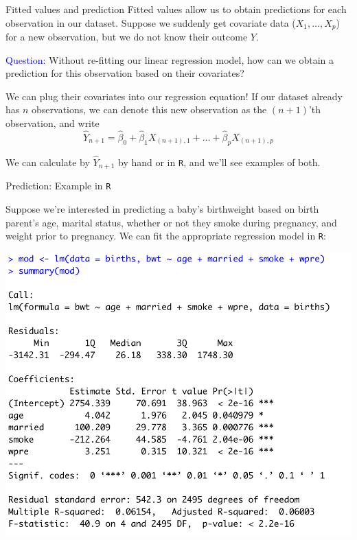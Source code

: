 \documentclass[10pt,t]{beamer}
\begin{document}
\begin{frame}{Fitted values and prediction}
Fitted values allow us to obtain predictions for each observation in our dataset. Suppose we suddenly get covariate data ($X_1, \dots, X_p$) for a new observation, but we do not know their outcome $Y$. 

\vspace{0.3cm} 

\textcolor{blue}{Question:} Without re-fitting our linear regression model, how can we obtain a prediction for this observation based on their covariates? \pause

\vspace{0.3cm}

We can plug their covariates into our regression equation! If our dataset already has $n$ observations, we can denote this new observation as the $(n + 1)$'th observation, and write
$$
\hat{Y}_{n + 1} = \hat{\beta}_0 + \hat{\beta}_1 X_{(n + 1), 1} + \dots + \hat{\beta}_p X_{(n + 1), p}
$$

We can calculate by $\hat{Y}_{n + 1}$ by hand or in \texttt{R}, and we'll see examples of both.

\end{frame}

\begin{frame}{Prediction: Example in \texttt{R}}

Suppose we're interested in predicting a baby's birthweight based on birth parent's age, marital status, whether or not they smoke during pregnancy, and weight prior to pregnancy. We can fit the appropriate regression model in \texttt{R}:

\vspace{0.2cm}

\centering \includegraphics[scale=0.35]{figures/predict_reg.png}
\end{frame}
\end{document}
